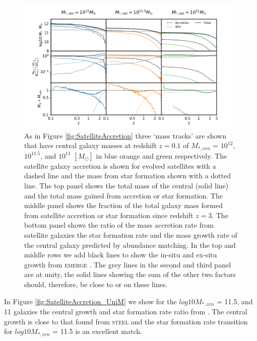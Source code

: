 \begin{figure}
    \centering
    \includegraphics[width = \linewidth]{Appendices/StellarMassAssembly/SatelliteAccretion_EMERGE.png}
    \caption{As in Figure \ref{fig:SatelliteAccretion} three `mass tracks' are shown that have central galaxy masses at redshift $z = 0.1$ of $M_{*,cen}$ = $10^{12}$, $10^{11.5}$, and $10^{11}$ $[M_{\odot}]$ in blue orange and green respectively. The satellite galaxy accretion is shown for evolved satellites with a dashed line and the mass from star formation shown with a dotted line. The top panel shows the total mass of the central (solid line) and the total mass gained from accretion or star formation. The middle panel shows the fraction of the total galaxy mass formed from satellite accretion or star formation since redshift $z=3$. The bottom panel shows the ratio of the mass accretion rate from satellite galaxies the star formation rate and the mass growth rate of the central galaxy predicted by abundance matching. In the top and middle rows we add black lines to show the in-situ and ex-situ growth from \textsc{emerge} \citet{Moster2018Emerge10}. The grey lines in the second and third panel are at unity, the solid lines showing the sum of the other two factors should, therefore, be close to or on these lines.}
    \label{fig:SatelliteAccretion_EMERGE}
\end{figure}

In Figure \ref{fig:SatelliteAccretion_UniM} we show for the $log 10 M_{*,cen}$ = 11.5, and 11 galaxies the central growth and star formation rate ratio from \citet{Behroozi2019UniverseMachine:010}. The central growth is close to that found from \textsc{steel} and the star formation rate transition for  $log 10 M_{*,cen}$ = 11.5 is an excellent match.

